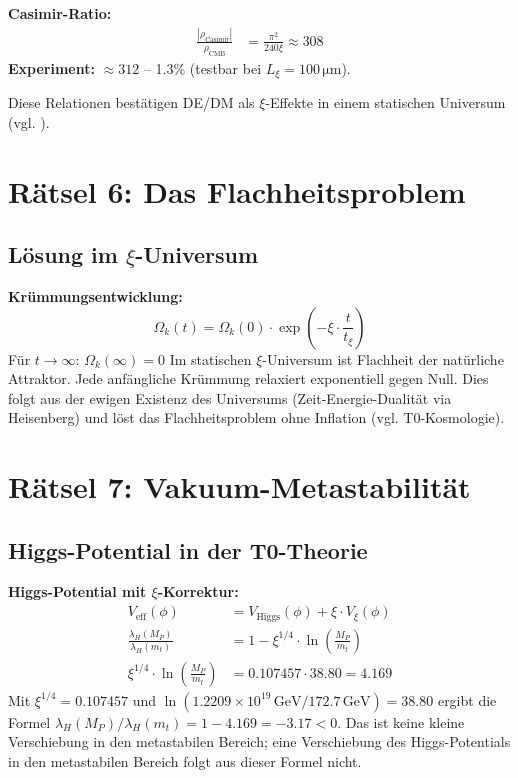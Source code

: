 	\textbf{Casimir-Ratio:}
	\begin{align}
		\frac{|\rho_{\text{Casimir}}|}{\rho_{\text{CMB}}} &= \frac{\pi^2}{240 \xi} \approx 308
	\end{align}
	\textbf{Experiment:} $\approx 312$ – 1.3\% (testbar bei $L_\xi = 100\,\si{\micro\meter}$).
	
	Diese Relationen bestätigen DE/DM als $\xi$-Effekte in einem statischen Universum (vgl. \cite{t0_kosmologie}).
	\section{Rätsel 6: Das Flachheitsproblem}
	\subsection{Lösung im $\xi$-Universum}
	\textbf{Krümmungsentwicklung:}
	\begin{equation}
		\Omega_k(t) = \Omega_k(0) \cdot \exp\left(-\xi \cdot \frac{t}{t_\xi}\right)
	\end{equation}
	Für $t \to \infty$: $\Omega_k(\infty) = 0$
	Im statischen $\xi$-Universum ist Flachheit der natürliche Attraktor. Jede anfängliche Krümmung relaxiert exponentiell gegen Null. Dies folgt aus der ewigen Existenz des Universums (Zeit-Energie-Dualität via Heisenberg) und löst das Flachheitsproblem ohne Inflation (vgl. T0-Kosmologie).
	\section{Rätsel 7: Vakuum-Metastabilität}
	\subsection{Higgs-Potential in der T0-Theorie}
	\textbf{Higgs-Potential mit $\xi$-Korrektur:}
	\begin{align}
		V_{\text{eff}}(\phi) &= V_{\text{Higgs}}(\phi) + \xi \cdot V_\xi(\phi) \\
		\frac{\lambda_H(M_P)}{\lambda_H(m_t)} &= 1 - \xi^{1/4} \cdot \ln\left(\frac{M_P}{m_t}\right) \\
		\xi^{1/4} \cdot \ln\left(\frac{M_P}{m_t}\right) &= 0.107457 \cdot 38.80 = 4.169
	\end{align}
	Mit $\xi^{1/4} = 0.107457$ und $\ln(1.2209\times10^{19}\,\mathrm{GeV}/172.7\,\mathrm{GeV}) = 38.80$ ergibt die Formel $\lambda_H(M_P)/\lambda_H(m_t) = 1 - 4.169 = -3.17 < 0$. Das ist keine kleine Verschiebung in den metastabilen Bereich; eine Verschiebung des Higgs-Potentials in den metastabilen Bereich folgt aus dieser Formel nicht.
